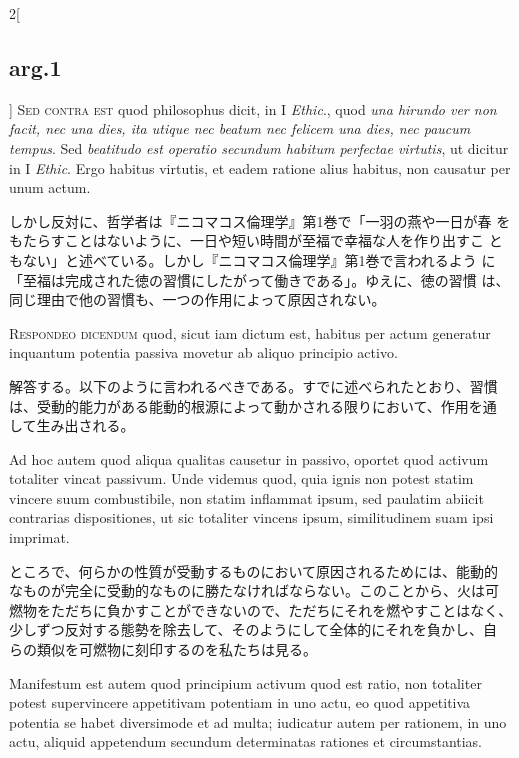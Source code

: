 \documentclass[paper=a4paper,fontsize=10pt,jafontsize=9pt,titlepage]{jlreq}
\begin{document}
\begin{paracol}{2}[\subsection{arg.1}]
{\scshape Sed contra est} quod philosophus dicit, in I {\itshape
Ethic}., quod {\itshape una hirundo ver non facit, nec una dies, ita
utique nec beatum nec felicem una dies, nec paucum tempus}. Sed
{\itshape beatitudo est operatio secundum habitum perfectae virtutis},
ut dicitur in I {\itshape Ethic}. Ergo habitus virtutis, et eadem
ratione alius habitus, non causatur per unum actum.

\switchcolumn

しかし反対に、哲学者は『ニコマコス倫理学』第1巻で「一羽の燕や一日が春
をもたらすことはないように、一日や短い時間が至福で幸福な人を作り出すこ
ともない」と述べている。しかし『ニコマコス倫理学』第1巻で言われるよう
に「至福は完成された徳の習慣にしたがって働きである」。ゆえに、徳の習慣
は、同じ理由で他の習慣も、一つの作用によって原因されない。


{\scshape Respondeo dicendum} quod, sicut iam dictum est, habitus per
actum generatur inquantum potentia passiva movetur ab aliquo principio
activo.

\switchcolumn

解答する。以下のように言われるべきである。すでに述べられたとおり、習慣
は、受動的能力がある能動的根源によって動かされる限りにおいて、作用を通
して生み出される。

\switchcolumn*

Ad hoc autem quod aliqua qualitas causetur in passivo, oportet quod
activum totaliter vincat passivum. Unde videmus quod, quia ignis non
potest statim vincere suum combustibile, non statim inflammat ipsum,
sed paulatim abiicit contrarias dispositiones, ut sic totaliter
vincens ipsum, similitudinem suam ipsi imprimat.

\switchcolumn

ところで、何らかの性質が受動するものにおいて原因されるためには、能動的
なものが完全に受動的なものに勝たなければならない。このことから、火は可
燃物をただちに負かすことができないので、ただちにそれを燃やすことはなく、
少しずつ反対する態勢を除去して、そのようにして全体的にそれを負かし、自
らの類似を可燃物に刻印するのを私たちは見る。

\switchcolumn*

Manifestum est autem quod principium activum quod est ratio, non
totaliter potest supervincere appetitivam potentiam in uno actu, eo
quod appetitiva potentia se habet diversimode et ad multa; iudicatur
autem per rationem, in uno actu, aliquid appetendum secundum
determinatas rationes et circumstantias.


\end{paracol}
\end{document}
